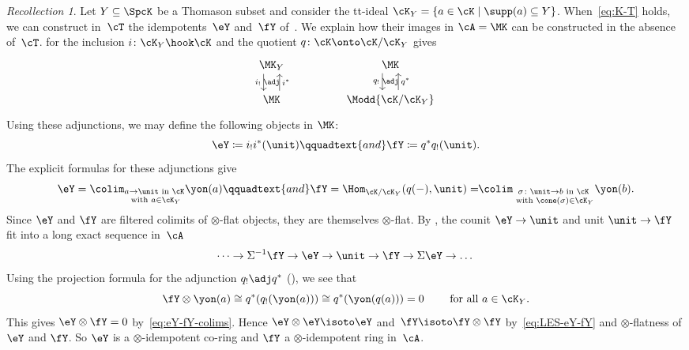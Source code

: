 \documentclass[11pt]{amsart}
\numberwithin{equation}{section} %
\theoremstyle{plain}
\theoremstyle{definition}
\theoremstyle{remark}
\newtheorem{rec}[equation]{Recollection}
\begin{document}
%
\begin{rec}
\label{rec:eY-fY}%
Let $Y \subseteq \SpcK$ be a Thomason subset and consider the tt-ideal $\cK_Y = \{ a \in \cK \mid \supp(a) \subseteq Y\}$. 
When~\eqref{eq:K-T} holds, we can construct in~$\cT$ the idempotents~$\eY$ and~$\fY$ of~\cite{BalmerFavi11}. We explain how their images in $\cA=\MK$ can be constructed in the absence of~$\cT$.
 for the inclusion $i \colon \cK_{Y} \hook \cK$ and the quotient $q \colon \cK \onto \cK/\cK_Y$ gives
\[\begin{tikzcd}[row sep=1.5em]
	{\MK_Y} && \MK \\
	\MK && {\Modd{\cK/\cK_Y}}
	\arrow[""{name=0, anchor=center, inner sep=0}, "{i_!}"', shift right=3, from=1-1, to=2-1]
	\arrow[""{name=1, anchor=center, inner sep=0}, "{q_!}"', shift right=3, from=1-3, to=2-3]
	\arrow[""{name=2, anchor=center, inner sep=0}, "{i^*}"', shift right=3, from=2-1, to=1-1]
	\arrow[""{name=3, anchor=center, inner sep=0}, "{q^*}"', shift right=3, from=2-3, to=1-3]
	\arrow["\adj"{anchor=center}, draw=none, from=0, to=2]
	\arrow["\adj"{anchor=center}, draw=none, from=1, to=3]
\end{tikzcd}\]
Using these adjunctions, we may define the following objects in $\MK$:
\begin{equation*}
    \label{equ:eY-fY}
    \eY \coloneq i_! i^* (\unit) \qquadtext{and} \fY \coloneq q^* q_!(\unit). 
\end{equation*}
%
The explicit formulas for these adjunctions give
%
\begin{equation}\label{eq:eY-fY-colims}
    \eY = \colim_{\substack{a \to \unit \textrm{ in }\cK\\[.1em] \textrm{ with }a \in \cK_Y}} \yon(a)
\qquadtext{and}
\fY = \Hom_{\cK/\cK_Y}(q(-), \unit) =\!\! \colim_{\substack{\sigma \colon\unit \to b \textrm{ in }\cK\\[.1em] \textrm{ with }\cone(\sigma) \in \cK_Y}} \yon(b).
\end{equation}
%
Since $\eY$ and $\fY$ are filtered colimits of $\otimes$-flat objects, they are themselves $\otimes$-flat. 
By \cite[Proposition 2.10]{BIK15}, the counit $\eY \to \unit$ and unit $\unit \to \fY$ fit into a long exact sequence in~$\cA$
\begin{equation}\label{eq:LES-eY-fY}
   \dots \to  \Sigma^{-1} \fY \to \eY \to \unit \to \fY \to \Sigma \eY \to \dots 
\end{equation}
Using the projection formula for the adjunction $q_! \adj q^*$ (), we see that
%
\begin{equation}
\label{eq:fY-tens-KY=0}%
\fY\otimes \yon(a)\cong q^*(q_!(\yon(a)))\cong q^*(\yon(q(a)))=0\qquad\textrm{ for all }a\in\cK_Y.
\end{equation}
%
This gives $\eY \otimes \fY = 0$ by~\eqref{eq:eY-fY-colims}. Hence $\eY \otimes \eY \isoto \eY$ {and}~$\fY \isoto \fY \otimes \fY$
by~\eqref{eq:LES-eY-fY} and $\otimes$-flatness of $\eY$ and $\fY$. So $\eY$ is a $\otimes$-idempotent co-ring and $\fY$ a $\otimes$-idempotent ring in~$\cA$.
%
\end{rec}
\end{document}
